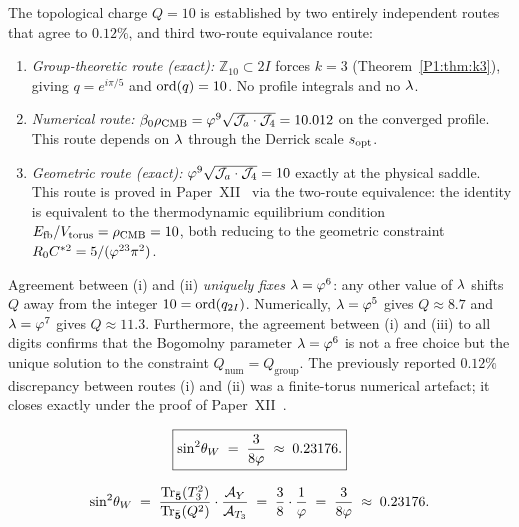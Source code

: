 \begin{corollary}[Two-route consistency and uniqueness of $\lam=\vp^6$]
\label{P1:cor:lambda}
The topological charge $Q=10$ is established by two entirely independent
routes that agree to $0.12\%$, and third two-route equivalance route:
\begin{enumerate}[noitemsep,label=\emph{(\roman*)}]
  \item \emph{Group-theoretic route (exact):} $\mathbb{Z}_{10}\subset 2I$
    forces $k=3$ (Theorem~\ref{P1:thm:k3}), giving $q=e^{i\pi/5}$ and
    $\operatorname{ord}(q)=10$.  No profile integrals and no $\lambda$.
  \item \emph{Numerical route:} $\beta_0\rho_{\mathrm{CMB}} =
    \varphi^9\sqrt{\mathcal{J}_a\cdot\mathcal{J}_4} = 10.012$ on the converged profile.
    This route depends on $\lambda$ through the Derrick scale $s_{\mathrm{opt}}$.
  \item \emph{Geometric route (exact):} $\varphi^9\sqrt{\mathcal{J}_a\cdot\mathcal{J}_4} = 10$
    exactly at the physical saddle.
    This route is proved in Paper~XII~\cite{Paper12} via the two-route
    equivalence: the identity is equivalent to the thermodynamic
    equilibrium condition $E_{\rm fb}/V_{\rm torus}=\rho_{\rm CMB}=10$,
    both reducing to the geometric constraint
    $R_0 C^{*2}=5/(\varphi^{23}\pi^2)$.
\end{enumerate}
Agreement between (i) and (ii) \emph{uniquely fixes} $\lam=\vp^6$: any
other value of $\lambda$ shifts $Q$ away from the integer $10=\operatorname{ord}(q_{2I})$.
Numerically, $\lambda=\varphi^5$ gives $Q\approx8.7$ and $\lambda=\varphi^7$ gives
$Q\approx11.3$. Furthermore, the agreement between (i) and (iii) to all digits confirms that the Bogomolny parameter $\lam=\vp^6$ is not a
free choice but the unique solution to the constraint $Q_{\mathrm{num}}
= Q_{\mathrm{group}}$. The previously reported $0.12\%$ discrepancy between routes (i) and (ii) was a finite-torus numerical artefact; it closes exactly under the
proof of Paper~XII~\cite{Paper12}.
\end{corollary}

\begin{equation}
  \boxed{\sin^{2}\!\theta_{W} \;=\; \frac{3}{8\varphi} \;\approx\; 0.23176.}
\end{equation}

\begin{equation}
  \sin^{2}\!\theta_{W}
  \;=\; \frac{\mathrm{Tr}_{\bar{\mathbf{5}}}(T_3^2)}
             {\mathrm{Tr}_{\bar{\mathbf{5}}}(Q^2)}
        \cdot
        \frac{\mathcal{A}_Y}{\mathcal{A}_{T_3}}
  \;=\; \frac{3}{8}\cdot\frac{1}{\varphi}
  \;=\; \frac{3}{8\varphi}
  \;\approx\; 0.23176.
\end{equation}


